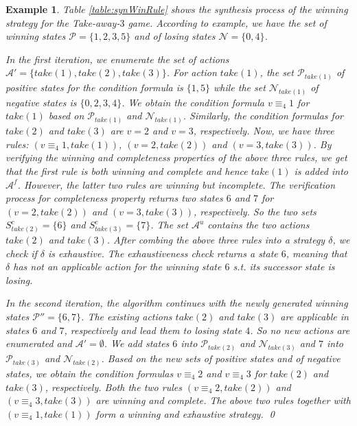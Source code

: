 \documentclass[review]{elsarticle}
\newcommand{\set}[1]{\{ #1 \}}
\newcommand{\positiveSet}{\mathcal{P}}
\newcommand{\negativeSet}{\mathcal{N}}
\newcommand{\act}{\mathcal{A}}
\newcommand{\modulo}{\equiv}
\newtheorem{example}{Example}
\begin{document}
\begin{example} %
    Table \ref{table:synWinRule} shows the synthesis process of the winning strategy for the Take-away-$3$ game. %
    According to example, we have the set of winning states $\positiveSet = \set{1, 2, 3, 5}$ and of losing states $\negativeSet = \set{0, 4}$.    
	
	In the first iteration, we enumerate the set of actions $\act' = \{take(1), take(2), take(3)\}$.
	For action $take(1)$, the set $\positiveSet_{take(1)}$ of positive states for the condition formula is $\set{1, 5}$ while the set $\negativeSet_{take(1)}$ of negative states is $\set{0, 2, 3, 4}$.
	We obtain the condition formula $v \modulo_4 1$ for $take(1)$ based on $\positiveSet_{take(1)}$ and $\negativeSet_{take(1)}$.
	Similarly, the condition formulas for $take(2)$ and $take(3)$ are $v = 2$ and $v = 3$, respectively.
	Now, we have three rules: $(v \modulo_4 1, take(1))$, $(v = 2, take(2))$ and $(v = 3, take(3))$.
	By verifying the winning and completeness properties of the above three rules, we get that the first rule is both winning and complete and hence $take(1)$ is added into $\act^f$.
	However, the latter two rules are winning but incomplete.
	The verification process for completeness property returns two states $6$ and $7$ for $(v = 2, take(2))$ and $(v = 3, take(3))$, respectively.
	So the two sets $S^c_{take(2)} = \set{6}$ and $S^c_{take(3)} = \set{7}$.
	The set $\act^u$ contains the two actions $take(2)$ and $take(3)$.
	After combing the above three rules into a strategy $\delta$, we check if $\delta$ is exhaustive.
	The exhaustiveness check returns a state $6$, meaning that $\delta$ has not an applicable action for the winning state $6$ s.t. its successor state is losing.
		
    In the second iteration, the algorithm continues with the newly generated winning states $\positiveSet'' = \set{6, 7}$.
    The existing actions $take(2)$ and $take(3)$ are applicable in states $6$ and $7$, respectively and lead them to losing state $4$. %
    So no new actions are enumerated and $\act' = \emptyset$.
    We add states $6$ into $\positiveSet_{take(2)}$ and $\negativeSet_{take(3)}$ and $7$ into $\positiveSet_{take(3)}$ and $\negativeSet_{take(2)}$.
    Based on the new sets of positive states and of negative states, we obtain the condition formulas $v \modulo_4 2$ and $v \modulo_4 3$ for $take(2)$ and $take(3)$, respectively.
    Both the two rules $(v \modulo_4 2, take(2))$ and $(v \modulo_4 3, take(3))$ are winning and complete.
    The above two rules together with $(v \modulo_4 1, take(1))$ form a winning and exhaustive strategy. \qed 
\end{example}	
\end{document}
